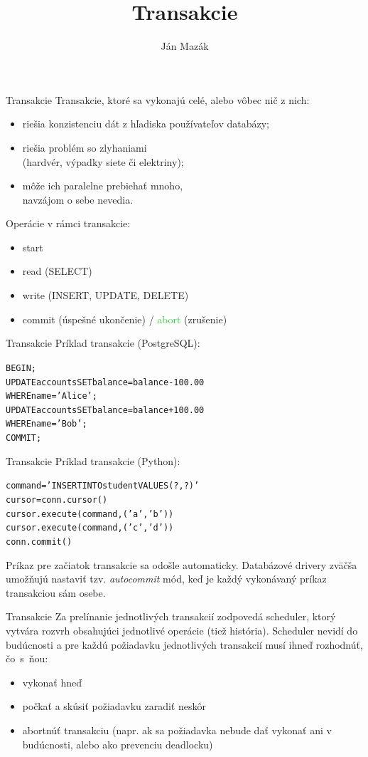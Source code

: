 \documentclass[12pt]{beamer}
\title{Transakcie}
\author{Ján Mazák}
\institute{FMFI UK Bratislava}
\date{}
\def\blue#1{\textcolor{Cerulean}{#1}}
\def\green#1{\textcolor{LimeGreen}{#1}}
\begin{document}
\frame{\titlepage}


\begin{frame}[fragile]{Transakcie}
\alert{Transakcie}, ktoré sa vykonajú celé, alebo vôbec nič z nich:
\begin{itemize}
\item riešia konzistenciu dát z hľadiska používateľov databázy;
\item riešia problém so zlyhaniami\\ (hardvér, výpadky siete či elektriny);
\item môže ich paralelne prebiehať mnoho,\\ navzájom o sebe nevedia.
\end{itemize}

\bigskip
Operácie v rámci transakcie:
\begin{itemize}
\item start
\item read (SELECT)
\item write (INSERT, UPDATE, DELETE)
\item \blue{commit} (úspešné ukončenie) / \green{abort} (zrušenie)
\end{itemize}
\end{frame}


\begin{frame}[fragile]{Transakcie}
Príklad transakcie (PostgreSQL):
\begin{alltt}
    BEGIN;
    UPDATE accounts SET balance = balance - 100.00
        WHERE name = 'Alice';
    UPDATE accounts SET balance = balance + 100.00
        WHERE name = 'Bob';
    COMMIT;
\end{alltt}
\end{frame}


\begin{frame}[fragile]{Transakcie}
Príklad transakcie (Python):
\begin{alltt}
    command = 'INSERT INTO student VALUES (?, ?)'
    cursor = conn.cursor()
    cursor.execute(command, ('a', 'b'))
    cursor.execute(command, ('c', 'd'))
    conn.commit()
\end{alltt}
Príkaz pre začiatok transakcie sa odošle automaticky.
Databázové drivery zväčša umožňujú nastaviť tzv. \emph{autocommit} mód,
keď je každý vykonávaný príkaz transakciou sám osebe.
\end{frame}


\begin{frame}[fragile]{Transakcie}
Za prelínanie jednotlivých transakcií zodpovedá \blue{scheduler},
ktorý vytvára \alert{rozvrh} obsahujúci jednotlivé operácie (tiež \alert{história}).
Scheduler nevidí do budúcnosti a pre každú požiadavku jednotlivých transakcií
musí ihneď rozhodnúť, čo~s~ňou:
\begin{itemize}
\item vykonať hneď
\item počkať a skúsiť požiadavku zaradiť neskôr
\item abortnúť transakciu (napr. ak sa požiadavka nebude dať vykonať ani v budúcnosti, alebo ako prevenciu deadlocku)
\end{itemize}
\end{frame}
\end{document}
